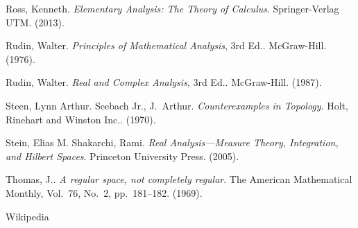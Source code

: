 \begin{thebibliography}{9}
Ross, Kenneth.  \textit{Elementary Analysis:  The Theory of Calculus}.  Springer-Verlag UTM.  (2013).

Rudin, Walter.  \textit{Principles of Mathematical Analysis}, 3rd Ed..  McGraw-Hill.  (1976).

Rudin, Walter.  \textit{Real and Complex Analysis}, 3rd Ed..  McGraw-Hill.  (1987).

Steen, Lynn Arthur.  Seebach Jr., J.~Arthur.  \textit{Counterexamples in Topology}.  Holt, Rinehart and Winston Inc..  (1970).

Stein, Elias M.  Shakarchi, Rami.  \textit{Real Analysis---Measure Theory, Integration, and Hilbert Spaces}.  Princeton University Press.  (2005).

Thomas, J..  \textit{A regular space, not completely regular}.  The American Mathematical Monthly, Vol.~76, No.~2, pp.~181--182.  (1969).

Wikipedia

\end{thebibliography}